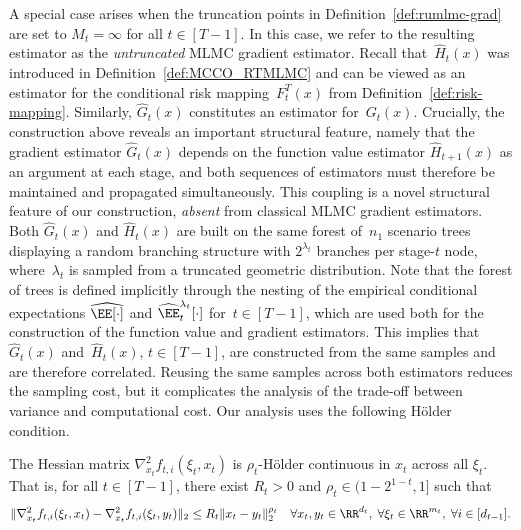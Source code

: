 \documentclass[11pt]{article}
\let\hat\widehat
\begin{document}
A special case arises when the truncation points in Definition~\ref{def:rumlmc-grad} are set to $M_t = \infty$ for all $t \in [T-1]$. In this case, we refer to the resulting estimator as the \emph{untruncated} MLMC gradient estimator. Recall that~$\hat{H}_t(x)$ was introduced in Definition~\ref{def:MCCO_RTMLMC} and can be viewed as an estimator for the conditional risk mapping~$F_t^T(x)$ from Definition~\ref{def:risk-mapping}. Similarly, $\hat{G}_t(x)$ constitutes an estimator for~$G_t(x)$. Crucially, the construction above reveals an important structural feature, namely that the gradient estimator $\hat{G}_t(x)$ depends on the function value estimator $\hat{H}_{t+1}(x)$ as an argument at each stage, and both sequences of estimators must therefore be maintained and propagated simultaneously. This coupling is a novel structural feature of our construction, \emph{absent} from classical MLMC gradient estimators. Both $\hat{G}_t(x)$ and $\hat{H}_t(x)$ are built on the same forest of~$n_1$ scenario trees displaying a random branching structure with $2^{\lambda_t}$ branches per stage-$t$ node, where~$\lambda_t$ is sampled from a truncated geometric distribution. Note that the forest of trees is defined implicitly through the nesting of the empirical conditional expectations $\hat\EE[\cdot]$ and $\hat\EE_t^{\lambda_t}[\cdot]$ for~$t\in[T-1]$, which are used both for the construction of the function value and gradient estimators. This implies that~$\hat{G}_t(x)$ and~$\hat{H}_t(x)$, $t\in[T-1]$, are constructed from the same samples and are therefore correlated. Reusing the same samples across both estimators reduces the sampling cost, but it complicates the analysis of the trade-off between variance and computational cost. Our analysis uses the following H\"older condition. 


\begin{assumption}\label{assump:holder}
     The Hessian matrix $\nabla^2_{x_t} f_{t,i} (\xi_t,x_t)$ is $\rho_t$-Hölder continuous in $x_t$ across all $\xi_t$. That is, for all $t\in[T-1]$, there exist $R_t>0$ and $\rho_t\in( 1-2^{1-t}, 1]$ such that
    \begin{equation*}
        \|\nabla^2_{x_t} f_{t,i} (\xi_t,x_t)-\nabla^2_{x_t}  f_{t,i}(\xi_t,y_t)\|_2 \leq R_t \|x_t-y_t\|_2^{\rho_t} \quad \forall x_t,y_t\in\RR^{d_t}, \;\forall \xi_t\in\RR^{m_t}, \; \forall i\in[d_{t-1}].
    \end{equation*}
\end{assumption}
\end{document}
